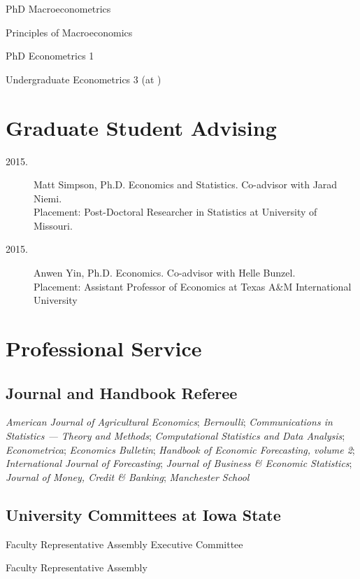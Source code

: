 \documentclass[12pt]{article}%
\newcommand{\allcaps}[1]{\textls{\MakeUppercase{#1}}}
\begin{document}
\begin{description}[noitemsep]
\item[2011 -- present.] PhD Macroeconometrics
\item[2010 -- present.] Principles of Macroeconomics
\item[2009 -- present.] PhD Econometrics 1
\item[2009.] Undergraduate Econometrics 3 (at \allcaps{UCSD})
\end{description}

\section*{Graduate Student Advising}
\begin{description}
\item[2015.] Matt Simpson, Ph.D. Economics and Statistics.  Co-advisor
with Jarad Niemi. \\
Placement: Post-Doctoral Researcher in Statistics at University of Missouri.
\item[2015.] Anwen Yin, Ph.D. Economics. Co-advisor with Helle Bunzel. \\
Placement: Assistant Professor of Economics at Texas A\&M
International University
\end{description}

\section*{Professional Service}

\subsection*{Journal and Handbook Referee}
\textit{American Journal of Agricultural Economics};
\textit{Bernoulli};
\textit{Communications in Statistics --- Theory and Methods};
\textit{Computational Statistics and Data Analysis};
\textit{Econometrica};
\textit{Economics Bulletin};
\textit{Handbook of Economic Forecasting, volume 2};
\textit{International Journal of Forecasting};
\textit{Journal of Business \& Economic Statistics};
\textit{Journal of Money, Credit \& Banking};
\textit{Manchester School}

\subsection*{University Committees at Iowa State}

\begin{description}[noitemsep]
\item[2014 -- present.] Faculty Representative Assembly Executive
Committee
\item[2013 -- present.] Faculty Representative Assembly
\end{description}
\end{document}
